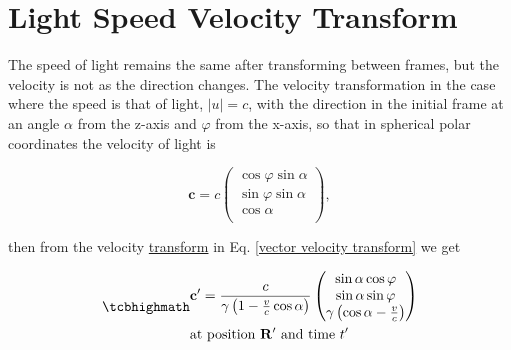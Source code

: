 \section{Light Speed Velocity Transform}

The speed of light remains the same after transforming between frames, but the velocity is not as the direction changes. The velocity transformation in the case where the speed is that of light, $|u|=c$, with the direction in the initial frame at an angle $\alpha$ from the z-axis and $\varphi$ from the x-axis, so that in spherical polar coordinates the velocity of light is

\begin{equation}
	\mathbf{c} = c
	\begin{pmatrix}
		\cos{\varphi}\sin{\alpha} \\
		\sin{\varphi}\sin{\alpha} \\
		\cos{\alpha}              \\
	\end{pmatrix},
\end{equation}

then from the velocity \hyperlink{def-transform}{transform} in Eq. \eqref{vector velocity transform} we get


\begin{equation}
	\label{light speed velocity transform}
	\mhl{
		\begin{aligned}
			 & \mathbf{c'} = \dfrac{c}{\gamma\left(1- \frac{v}{c} \cos\alpha\right) }
			\begin{pmatrix}
				\sin\alpha\cos\varphi                            \\
				\sin\alpha\sin\varphi                            \\
				\gamma \left( \cos\alpha  - \frac{v}{c}  \right) \\
			\end{pmatrix}
			\\
			 & \text{at position $\mathbf{R'}$ and time $t'$ }
		\end{aligned}
	}
\end{equation}


